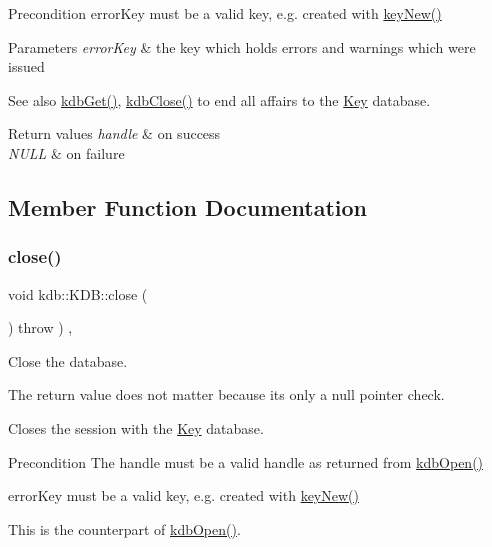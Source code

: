 \begin{DoxyPrecond}{Precondition}
error\+Key must be a valid key, e.\+g. created with \hyperlink{group__key_gad23c65b44bf48d773759e1f9a4d43b89}{key\+New()}
\end{DoxyPrecond}

\begin{DoxyParams}{Parameters}
{\em error\+Key} & the key which holds errors and warnings which were issued \\
\hline
\end{DoxyParams}
\begin{DoxySeeAlso}{See also}
\hyperlink{group__kdb_ga28e385fd9cb7ccfe0b2f1ed2f62453a1}{kdb\+Get()}, \hyperlink{group__kdb_gadb54dc9fda17ee07deb9444df745c96f}{kdb\+Close()} to end all affairs to the \hyperlink{group__key}{Key} database. 
\end{DoxySeeAlso}

\begin{DoxyRetVals}{Return values}
{\em handle} & on success \\
\hline
{\em N\+U\+LL} & on failure \\
\hline
\end{DoxyRetVals}


\subsection{Member Function Documentation}
\mbox{\label{classkdb_1_1KDB_a1b3ff4a68c2c935d67dce843bc4ad01b}} 
\subsubsection{\texorpdfstring{close()}{close()}\hspace{0.1cm}{\footnotesize\ttfamily [1/2]}}
{\footnotesize\ttfamily void kdb\+::\+K\+D\+B\+::close (\begin{DoxyParamCaption}{ }\end{DoxyParamCaption}) throw  ) \hspace{0.3cm}{\ttfamily [inline]}, {\ttfamily [virtual]}}



Close the database. 

The return value does not matter because its only a null pointer check.

Closes the session with the \hyperlink{classkdb_1_1Key}{Key} database. \begin{DoxyPrecond}{Precondition}
The handle must be a valid handle as returned from \hyperlink{group__kdb_ga6808defe5870f328dd17910aacbdc6ca}{kdb\+Open()}

error\+Key must be a valid key, e.\+g. created with \hyperlink{group__key_gad23c65b44bf48d773759e1f9a4d43b89}{key\+New()}
\end{DoxyPrecond}
This is the counterpart of \hyperlink{group__kdb_ga6808defe5870f328dd17910aacbdc6ca}{kdb\+Open()}.

